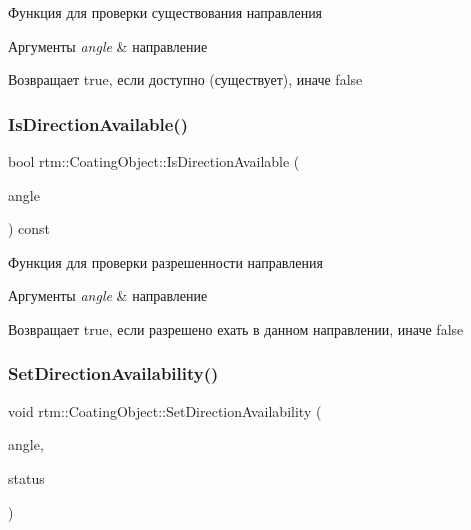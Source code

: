 Функция для проверки существования направления 
\begin{DoxyParams}{Аргументы}
{\em angle} & направление \\
\hline
\end{DoxyParams}
\begin{DoxyReturn}{Возвращает}
true, если доступно (существует), иначе false 
\end{DoxyReturn}
\mbox{\label{classrtm_1_1_coating_object_a4d7656260eaa296f1bfa2e957698c437}} 
\subsubsection{\texorpdfstring{Is\+Direction\+Available()}{IsDirectionAvailable()}}
{\footnotesize\ttfamily bool rtm\+::\+Coating\+Object\+::\+Is\+Direction\+Available (\begin{DoxyParamCaption}\item[{\hyperlink{namespacertm_a69dc82b16a0148c10962caa83d930f89}{Angle\+Type}}]{angle }\end{DoxyParamCaption}) const}

Функция для проверки разрешенности направления 
\begin{DoxyParams}{Аргументы}
{\em angle} & направление \\
\hline
\end{DoxyParams}
\begin{DoxyReturn}{Возвращает}
true, если разрешено ехать в данном направлении, иначе false 
\end{DoxyReturn}
\mbox{\label{classrtm_1_1_coating_object_a93eb37a24af3939337f6330209fae809}} 
\subsubsection{\texorpdfstring{Set\+Direction\+Availability()}{SetDirectionAvailability()}}
{\footnotesize\ttfamily void rtm\+::\+Coating\+Object\+::\+Set\+Direction\+Availability (\begin{DoxyParamCaption}\item[{\hyperlink{namespacertm_a69dc82b16a0148c10962caa83d930f89}{Angle\+Type}}]{angle,  }\item[{bool}]{status }\end{DoxyParamCaption})}

